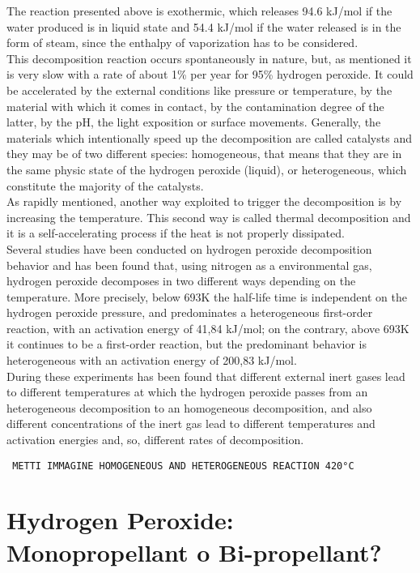 \documentclass[a4paper]{report}
\begin{document}
\vspace{0.5 cm}
The reaction presented above is exothermic, which releases 94.6 kJ/mol if the water produced is in liquid state and 54.4 kJ/mol if the water released is in the form of steam, since the enthalpy of vaporization has to be considered. \\
This decomposition reaction occurs spontaneously in nature, but, as mentioned it is very slow with a rate of about 1\% per year for 95\% hydrogen peroxide.%
It could be accelerated by the external conditions like pressure or temperature, by the material with which it comes in contact, by the contamination degree of the latter, by the pH, the light exposition or surface movements. Generally, the materials which intentionally speed up the decomposition are called catalysts and they may be of two different species: homogeneous, that means that they are in the same physic state of the hydrogen peroxide (liquid), or heterogeneous, which constitute the majority of  the catalysts. \\
As rapidly mentioned, another way exploited to trigger the decomposition is by increasing the temperature. This second way is called thermal decomposition and it is a self-accelerating process if the heat is not properly dissipated.\\ 
Several studies have been conducted on hydrogen peroxide decomposition behavior and has been found that, using nitrogen as a environmental gas, hydrogen peroxide decomposes in two different ways depending on the temperature. More precisely, below 693K  the half-life time is independent on the hydrogen peroxide pressure, and predominates a heterogeneous first-order reaction, with an activation energy of 41,84 kJ/mol; on the contrary, above 693K it continues to be a first-order reaction, but the predominant behavior is heterogeneous with an activation energy of 200,83 kJ/mol. \\ %
During these experiments has been found that different external inert gases lead to different temperatures at which the hydrogen peroxide passes from an heterogeneous decomposition to an homogeneous decomposition, and also different concentrations of the inert gas lead to different temperatures and activation energies and, so, different rates of decomposition. 

\texttt{\color{red} METTI IMMAGINE HOMOGENEOUS AND HETEROGENEOUS REACTION 420°C}

\section{Hydrogen Peroxide: Monopropellant o Bi-propellant?}
\end{document}
